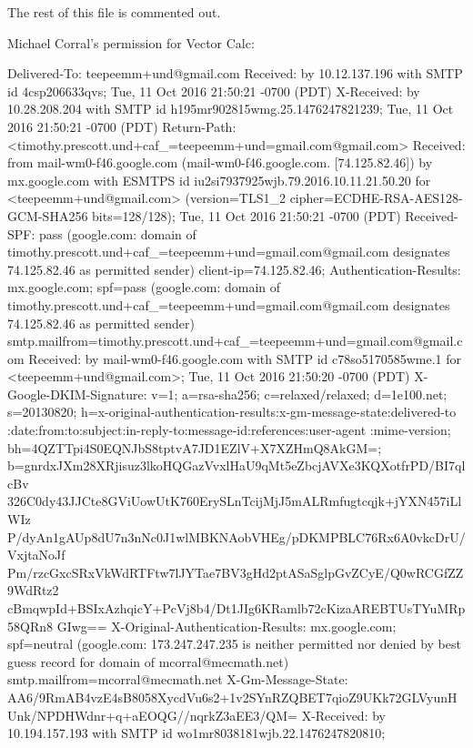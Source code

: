 \begin{itemize}
\begin{itemize}
\restoregeometry

\iffalse

The rest of this file is commented out.

Michael Corral's permission for Vector Calc:

Delivered-To: teepeemm+und@gmail.com
Received: by 10.12.137.196 with SMTP id 4csp206633qvs;
        Tue, 11 Oct 2016 21:50:21 -0700 (PDT)
X-Received: by 10.28.208.204 with SMTP id h195mr902815wmg.25.1476247821239;
        Tue, 11 Oct 2016 21:50:21 -0700 (PDT)
Return-Path: <timothy.prescott.und+caf_=teepeemm+und=gmail.com@gmail.com>
Received: from mail-wm0-f46.google.com (mail-wm0-f46.google.com. [74.125.82.46])
        by mx.google.com with ESMTPS id iu2si7937925wjb.79.2016.10.11.21.50.20
        for <teepeemm+und@gmail.com>
        (version=TLS1_2 cipher=ECDHE-RSA-AES128-GCM-SHA256 bits=128/128);
        Tue, 11 Oct 2016 21:50:21 -0700 (PDT)
Received-SPF: pass (google.com: domain of timothy.prescott.und+caf_=teepeemm+und=gmail.com@gmail.com designates 74.125.82.46 as permitted sender) client-ip=74.125.82.46;
Authentication-Results: mx.google.com;
       spf=pass (google.com: domain of timothy.prescott.und+caf_=teepeemm+und=gmail.com@gmail.com designates 74.125.82.46 as permitted sender) smtp.mailfrom=timothy.prescott.und+caf_=teepeemm+und=gmail.com@gmail.com
Received: by mail-wm0-f46.google.com with SMTP id c78so5170585wme.1
        for <teepeemm+und@gmail.com>; Tue, 11 Oct 2016 21:50:20 -0700 (PDT)
X-Google-DKIM-Signature: v=1; a=rsa-sha256; c=relaxed/relaxed;
        d=1e100.net; s=20130820;
        h=x-original-authentication-results:x-gm-message-state:delivered-to
         :date:from:to:subject:in-reply-to:message-id:references:user-agent
         :mime-version;
        bh=4QZTTpi4S0EQNJbS8tptvA7JD1EZlV+X7XZHmQ8AkGM=;
        b=gnrdxJXm28XRjisuz3lkoHQGazVvxlHaU9qMt5eZbcjAVXe3KQXotfrPD/BI7qlcBv
         326C0dy43JJCte8GViUowUtK760ErySLnTcijMjJ5mALRmfugtcqjk+jYXN457iLlWIz
         P/dyAn1gAUp8dU7n3nNc0J1wlMBKNAobVHEg/pDKMPBLC76Rx6A0vkcDrU/VxjtaNoJf
         Pm/rzcGxcSRxVkWdRTFtw7lJYTae7BV3gHd2ptASaSglpGvZCyE/Q0wRCGfZZ9WdRtz2
         cBmqwpId+BSIxAzhqicY+PcVj8b4/Dt1JIg6KRamlb72cKizaAREBTUsTYuMRp58QRn8
         GIwg==
X-Original-Authentication-Results: mx.google.com;
       spf=neutral (google.com: 173.247.247.235 is neither permitted nor denied by best guess record for domain of mcorral@mecmath.net) smtp.mailfrom=mcorral@mecmath.net
X-Gm-Message-State: AA6/9RmAB4vzE4sB8058XycdVu6s2+1v2SYnRZQBET7qioZ9UKk72GLVyunHUnk/NPDHWdnr+q+aEOQG//nqrkZ3aEE3/QM=
X-Received: by 10.194.157.193 with SMTP id wo1mr8038181wjb.22.1476247820810;

\end{itemize}
\end{itemize}
